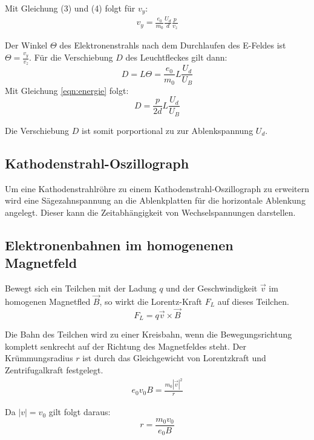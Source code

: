 Mit Gleichung (3) und (4) folgt für $v_y$:
\begin{align}
  v_y = \frac{e_0}{m_0} \frac{U_d}{d} \frac{p}{v_z}
\end{align}

Der Winkel $\Theta$ des Elektronenstrahls nach dem Durchlaufen des E-Feldes ist $\Theta = \frac{v_y}{v_z}$.
Für die Verschiebung $D$ des Leuchtfleckes gilt dann:
\begin{equation}
  D = L \Theta = \frac{e_0}{m_0} L \frac{U_d}{U_B}
\end{equation}
 Mit Gleichung \eqref{eqn:energie} folgt:
\begin{equation}
  D = \frac{p}{2d} L \frac{U_d}{U_B}
\end{equation}

Die Verschiebung $D$ ist somit porportional zu zur Ablenkspannung $U_d$.

\subsection{Kathodenstrahl-Oszillograph}

Um eine Kathodenstrahlröhre zu einem Kathodenstrahl-Oszillograph zu erweitern wird eine
Sägezahnspannung an die Ablenkplatten für die horizontale Ablenkung angelegt. Dieser
kann die Zeitabhängigkeit von Wechselspannungen darstellen.



\subsection{Elektronenbahnen im homogenenen Magnetfeld}

Bewegt sich ein Teilchen mit der Ladung $q$ und der Geschwindigkeit $\vec{v}$ im homogenen Magnetfled $\vec{B}$, so
wirkt die Lorentz-Kraft $F_L$ auf dieses Teilchen.
\begin{equation}
  F_L = q \vec{v} \times \vec{B}
\end{equation}

Die Bahn des Teilchen wird zu einer Kreisbahn, wenn die Bewegungsrichtung komplett senkrecht auf der
Richtung des Magnetfeldes steht.
Der Krümmungsradius $r$ ist durch das Gleichgewicht von Lorentzkraft und Zentrifugalkraft festgelegt.
\begin{align}
  e_0 v_0 B = \frac{m_0 | \vec{v} |^2}{r}
\end{align}

Da $|v| = v_0$ gilt folgt daraus:
\begin{equation}
  r = \frac{m_0 v_0}{e_0 B}
\end{equation}

